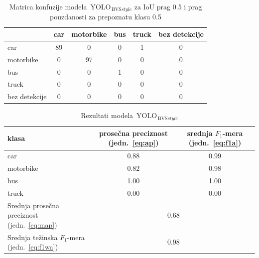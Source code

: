 \documentclass[12pt,oneside]{memoir}
\newcommand{\yolo}{\ensuremath{\,\textrm{YOLO}}}
\newcommand{\bvs}{\ensuremath{\,\textrm{BVS}}}
\begin{document}
\begin{table}[htb]
    \begin{center}
    \caption{Matrica konfuzije modela $\yolo_{\bvs{style}}$ za IoU prag 0.5 i prag pouzdanosti za prepoznatu klasu 0.5 }
    \begin{tabular}{ l|c|c|c|c|c|}
                  & car  & motorbike & bus & truck & bez detekcije \\ \hline
    car           & 89   & 0         & 0   & 1     & 0             \\ 
    motorbike     & 0    & 97        & 0   & 0     & 0             \\ 
    bus           & 0    & 0         & 1   & 0     & 0             \\ 
    truck         & 0    & 0         & 0   & 0     & 0             \\ 
    bez detekcije & 0    & 0         & 0   & 0     & 0             \\ \hline
    \hline
    \end{tabular}
    \label{tab:YOLO4_BVSstyle_confusion_mat}
    \end{center}
\end{table}

\begin{table}[htb]
    \begin{center}
    \caption{Rezultati modela $\yolo_{\bvs{style}}$}
        \begin{tabular}{|m{10em}|c|c|}
        \toprule
        klasa     & prosečna preciznost (jedn.~\ref{eq:ap}) & srednja $F_1$-mera (jedn.~\ref{eq:f1a})  \\ \hline
        \midrule
        car       & 0.88   & 0.99 \\ \hline
        motorbike & 0.82   & 0.98 \\ \hline
        bus       & 1.00   & 1.00 \\ \hline
        truck     & 0.00   & 0.00 \\ \hline
        \bottomrule
        Srednja prosečna preciznost (jedn.~\ref{eq:map}) & \multicolumn{2}{c|}{0.68}  \\ \hline
        Srednja težinska $F_1$-mera (jedn.~\ref{eq:f1wa}) & \multicolumn{2}{c|}{0.98}  \\
        \hline
    \end{tabular}
    \label{tab:YOLO4_BVSstyle_results}
    \end{center}
\end{table}
\end{document}
